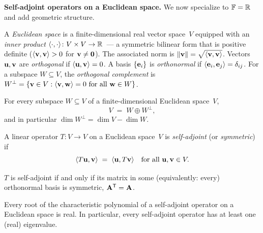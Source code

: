 \medskip

\noindent\textbf{Self-adjoint operators on a Euclidean space.}
We now specialize to $\mathbb{F} = \mathbb{R}$ and add geometric structure.

\begin{definition}
\label{def:euclidean-space}
A \emph{Euclidean space} is a finite-dimensional real vector
space~$V$ equipped with an \emph{inner product}
$\langle \cdot, \cdot \rangle \colon V \times V \to \mathbb{R}$~--- a
symmetric bilinear form that is positive definite
($\langle \mathbf{v}, \mathbf{v} \rangle > 0$ for $\mathbf{v} \neq \mathbf{0}$).
The associated norm is $\|\mathbf{v}\| = \sqrt{\langle \mathbf{v}, \mathbf{v} \rangle}$.
Vectors $\mathbf{u}, \mathbf{v}$ are \emph{orthogonal} if
$\langle \mathbf{u}, \mathbf{v} \rangle = 0$. A basis $\{\mathbf{e}_i\}$ is
\emph{orthonormal} if $\langle \mathbf{e}_i, \mathbf{e}_j \rangle = \delta_{ij}$.
For a subspace $W \subseteq V$, the \emph{orthogonal complement} is
$W^{\perp} = \{\mathbf{v} \in V : \langle \mathbf{v}, \mathbf{w} \rangle = 0
\text{ for all } \mathbf{w} \in W\}$.
\end{definition}

\begin{proposition}
\label{prop:orthogonal-decomposition}
For every subspace $W \subseteq V$ of a finite-dimensional Euclidean
space~$V$,
\[
  V \;=\; W \oplus W^{\perp},
\]
and in particular $\dim W^{\perp} = \dim V - \dim W$.
\end{proposition}

\begin{definition}
\label{def:self-adjoint}
A linear operator $T \colon V \to V$ on a Euclidean space~$V$ is
\emph{self-adjoint} (or \emph{symmetric}) if
\[
  \langle T\mathbf{u}, \mathbf{v} \rangle \;=\; \langle \mathbf{u}, T\mathbf{v} \rangle
  \quad \text{for all } \mathbf{u}, \mathbf{v} \in V.
\]
\end{definition}

\begin{proposition}
\label{prop:self-adj-symmetric}
$T$ is self-adjoint if and only if its matrix in some (equivalently:
every) orthonormal basis is symmetric, $\mathbf{A}^{\mathsf{T}} = \mathbf{A}$.
\end{proposition}

\begin{theorem}
\label{thm:self-adj-eig-real}
Every root of the characteristic polynomial of a self-adjoint operator
on a Euclidean space is real. In particular, every self-adjoint
operator has at least one (real) eigenvalue.
\end{theorem}

